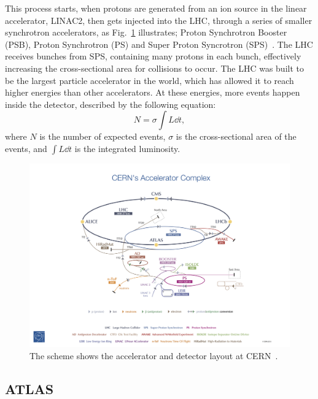 \documentclass[12pt,a4paper]{article}
\numberwithin{equation}{section}
\begin{document}
This process starts, when protons are generated from an ion source in the linear
accelerator, LINAC2, then gets injected into the LHC, through a series of
smaller synchrotron accelerators, as Fig.~\ref{fig:lhc} illustrates; Proton
Synchrotron Booster (PSB), Proton Synchrotron (PS) and Super Proton Syncrotron
(SPS)~\cite[135]{Evans_2008}. The LHC receives bunches from SPS, containing many
protons in each bunch, effectively increasing the cross-sectional area for
collisions to occur. The LHC was built to be the largest particle accelerator in the
world, which has allowed it to reach higher energies than other accelerators. At
these energies, more events happen inside the detector, described by the
following equation:
\begin{equation}
  N = \sigma \int L \dd t,
\end{equation}
where $N$ is the number of expected events, $\sigma$ is the cross-sectional area of
the events, and $\int L \dd t$ is the integrated luminosity.

\begin{figure}[H]
	\includegraphics[width=\linewidth]{figures/cern.jpg}
	\caption{The scheme shows the accelerator and detector layout at
    CERN~\cite{Haffner:1621894}.}\label{fig:lhc}
\end{figure}


\subsection{ATLAS}
\end{document}
